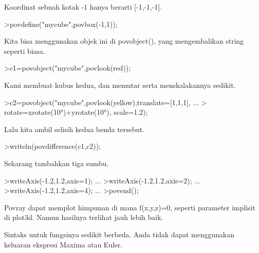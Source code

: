 \documentclass{article}
\begin{document}
\begin{eulernotebook}
\begin{eulercomment}
\begin{eulercomment}
\begin{eulercomment}
\begin{eulercomment}
\begin{eulercomment}
Koordinat sebuah kotak -1 hanya berarti [-1,-1,-1].
\end{eulercomment}
\begin{eulerprompt}
>povdefine("mycube",povbox(-1,1));
\end{eulerprompt}
\begin{eulercomment}
Kita bisa menggunakan objek ini di povobject(), yang mengembalikan
string seperti biasa.
\end{eulercomment}
\begin{eulerprompt}
>c1=povobject("mycube",povlook(red));
\end{eulerprompt}
\begin{eulercomment}
Kami membuat kubus kedua, dan memutar serta menskalakannya sedikit.
\end{eulercomment}
\begin{eulerprompt}
>c2=povobject("mycube",povlook(yellow),translate=[1,1,1], ...
>  rotate=xrotate(10°)+yrotate(10°), scale=1.2);
\end{eulerprompt}
\begin{eulercomment}
Lalu kita ambil selisih kedua benda tersebut.
\end{eulercomment}
\begin{eulerprompt}
>writeln(povdifference(c1,c2));
\end{eulerprompt}
\begin{eulercomment}
Sekarang tambahkan tiga sumbu.
\end{eulercomment}
\begin{eulerprompt}
>writeAxis(-1.2,1.2,axis=1); ...
>writeAxis(-1.2,1.2,axis=2); ...
>writeAxis(-1.2,1.2,axis=4); ...
>povend();
\end{eulerprompt}
\begin{eulercomment}
Povray dapat memplot himpunan di mana f(x,y,z)=0, seperti parameter
implisit di plot3d. Namun hasilnya terlihat jauh lebih baik.

Sintaks untuk fungsinya sedikit berbeda. Anda tidak dapat menggunakan
keluaran ekspresi Maxima atau Euler.


\end{eulercomment}
\end{eulercomment}
\end{eulercomment}
\end{eulercomment}
\end{eulercomment}
\end{eulernotebook}
\end{document}
